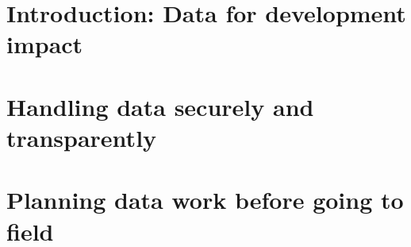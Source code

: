 %
%
%
%




\cleardoublepage
\chapter{Introduction: Data for development impact} %




\chapter{Handling data securely and transparently}
\label{ch:1}




\chapter{Planning data work before going to field}
\label{ch:2}




